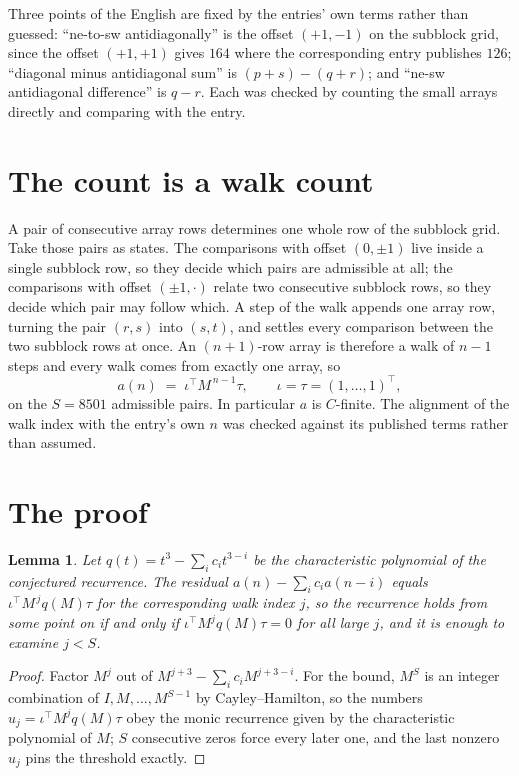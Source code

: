 \documentclass[11pt,a4paper]{article}
\theoremstyle{plain}
\newtheorem{lemma}[theorem]{Lemma}
\theoremstyle{definition}
\begin{document}
Three points of the English are fixed by the entries' own terms rather than guessed:
``ne-to-sw antidiagonally'' is the offset $(+1,-1)$ on the subblock grid, since the offset
$(+1,+1)$ gives $164$ where the corresponding entry publishes $126$; ``diagonal minus
antidiagonal sum'' is $(p+s)-(q+r)$; and ``ne-sw antidiagonal difference'' is $q-r$. Each was
checked by counting the small arrays directly and comparing with the entry.

\section{The count is a walk count}

A pair of consecutive array rows determines one whole row of the subblock grid. Take those
pairs as states. The comparisons with offset $(0,\pm1)$ live inside a single subblock row, so
they decide which pairs are admissible at all; the comparisons with offset $(\pm1,\cdot)$
relate two consecutive subblock rows, so they decide which pair may follow which. A step of the
walk appends one array row, turning the pair $(r,s)$ into $(s,t)$, and settles every comparison
between the two subblock rows at once. An $(n+1)$-row array is therefore a walk of $n-1$ steps
and every walk comes from exactly one array, so
\[
a(n)\;=\;\iota^{\!\top}M^{\,n-1}\tau,\qquad \iota=\tau=(1,\dots,1)^{\!\top},
\]
on the $S=8501$ admissible pairs. In particular $a$ is $C$-finite. The alignment of the walk
index with the entry's own $n$ was checked against its published terms rather than assumed.

\section{The proof}

\begin{lemma}\label{lem:crit}
Let $q(t)=t^{3}-\sum_i c_it^{3-i}$ be the characteristic polynomial of the
conjectured recurrence. The residual $a(n)-\sum_ic_ia(n-i)$ equals
$\iota^{\!\top}M^{\,j}q(M)\tau$ for the corresponding walk index $j$, so the recurrence
holds from some point on if and only if $\iota^{\!\top}M^{j}q(M)\tau=0$ for all large $j$,
and it is enough to examine $j<S$.
\end{lemma}

\begin{proof}
Factor $M^{j}$ out of $M^{j+3}-\sum_ic_iM^{j+3-i}$. For the bound, $M^{S}$
is an integer combination of $I,M,\dots,M^{S-1}$ by Cayley--Hamilton, so the numbers
$u_j=\iota^{\!\top}M^{j}q(M)\tau$ obey the monic recurrence given by the characteristic
polynomial of $M$; $S$ consecutive zeros force every later one, and the last nonzero $u_j$
pins the threshold exactly.
\end{proof}
\end{document}

